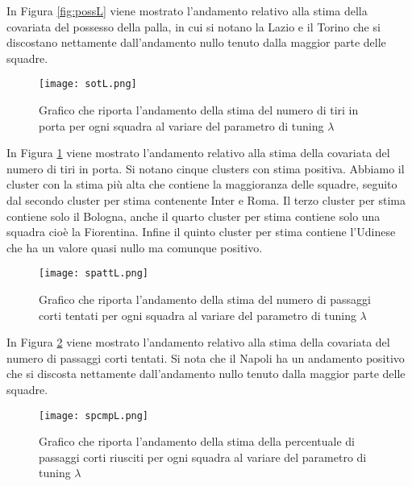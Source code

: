 In Figura \ref{fig:possL} viene mostrato l'andamento relativo alla stima della covariata del possesso della palla, in cui si notano la Lazio e il Torino che si discostano nettamente dall'andamento nullo tenuto dalla maggior parte delle squadre.

\begin{figure}[htbp]
	\begin{center}
		\texttt{[image: sotL.png]}
		\caption{Grafico che riporta l'andamento della stima del numero di tiri in porta per ogni squadra al variare del parametro di tuning $\lambda$} \label{fig:sotL}
	\end{center}
\end{figure}

In Figura \ref{fig:sotL} viene mostrato l'andamento relativo alla stima della covariata del numero di tiri in porta. Si notano cinque clusters con stima positiva. Abbiamo il cluster con la stima più alta che contiene la maggioranza delle squadre, seguito dal secondo cluster per stima contenente Inter e Roma. Il terzo cluster per stima contiene solo il Bologna, anche il quarto cluster per stima contiene solo una squadra cioè la Fiorentina. Infine il quinto cluster per stima contiene l'Udinese che ha un valore quasi nullo ma comunque positivo.

\begin{figure}[htbp]
	\begin{center}
		\texttt{[image: spattL.png]}
		\caption{Grafico che riporta l'andamento della stima del numero di passaggi corti tentati per ogni squadra al variare del parametro di tuning $\lambda$} \label{fig:spattL}
	\end{center}
\end{figure}

In Figura \ref{fig:spattL} viene mostrato l'andamento relativo alla stima della covariata del numero di passaggi corti tentati. Si nota che il Napoli ha un andamento positivo che si discosta nettamente dall'andamento nullo tenuto dalla maggior parte delle squadre.

\begin{figure}[htbp]
	\begin{center}
		\texttt{[image: spcmpL.png]}
		\caption{Grafico che riporta l'andamento della stima della percentuale di passaggi corti riusciti per ogni squadra al variare del parametro di tuning $\lambda$} \label{fig:spcmpL}
	\end{center}
\end{figure}

